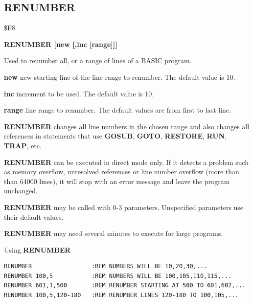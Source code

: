 \subsection{RENUMBER}
\begin{description}[leftmargin=2cm,style=nextline]
\item [Token:] \$F8
\item [Format:] {\bf RENUMBER [new [,inc [range]]]}
\item [Usage:] Used to renumber all, or
               a range of lines of a BASIC program.

               {\bf new } new starting line of the
               line range to renumber.
               The default value is 10.

               {\bf inc } increment to be used.
               The default value is 10.

               {\bf range } line range to renumber.
               The default values are from first to last line.

               {\bf RENUMBER} changes all line numbers in
               the chosen range and also changes all references
               in statements that use {\bf GOSUB}, {\bf GOTO},
               {\bf RESTORE}, {\bf RUN}, {\bf TRAP}, etc.

               {\bf RENUMBER} can be executed in direct mode only.
               If it detects a problem such as memory overflow,
               unresolved references or line number overflow
               (more than than 64000 lines), it will stop with an error
               message and leave the program unchanged.

               {\bf RENUMBER} may be called with 0-3 parameters.
               Unspecified parameters use their default values.

\item [Remarks:] {\bf RENUMBER} may need several
                 minutes to execute for large programs.

\item [Examples:] Using {\bf RENUMBER}
\begin{tcolorbox}[colback=black,coltext=white]
\verbatimfont{\codefont}
\begin{verbatim}
RENUMBER                 :REM NUMBERS WILL BE 10,20,30,...
RENUMBER 100,5           :REM NUMBERS WILL BE 100,105,110,115,...
RENUMBER 601,1,500       :REM RENUMBER STARTING AT 500 TO 601,602,...
RENUMBER 100,5,120-180   :REM RENUMBER LINES 120-180 TO 100,105,...
\end{verbatim}
\end{tcolorbox}
\end{description}

